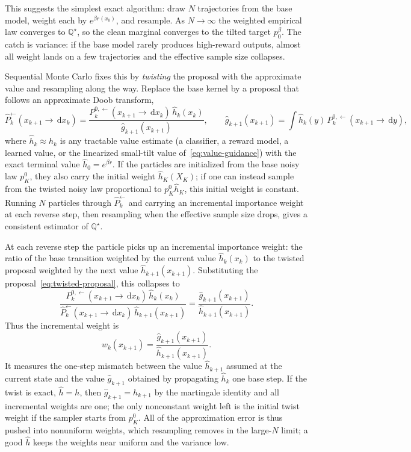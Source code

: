 \documentclass{amsart}
\numberwithin{equation}{section}
\theoremstyle{plain}
\theoremstyle{definition}
\theoremstyle{remark}
\newcommand{\dd}{\,\mathrm{d}}
\newcommand{\wh}[1]{\widehat{#1}}
\begin{document}
This suggests the simplest exact algorithm: draw $N$ trajectories from the base
model, weight each by $e^{\beta r(x_0)}$, and resample.  As $N\to\infty$ the
weighted empirical law converges to $\mathbb Q^\star$, so the clean marginal
converges to the tilted target $p_0^\beta$.  The catch is variance: if the base
model rarely produces high-reward outputs, almost all weight lands on a few
trajectories and the effective sample size collapses.

Sequential Monte Carlo fixes this by \emph{twisting} the proposal with the
approximate value and resampling along the way.  Replace the base kernel by a
proposal that follows an approximate Doob transform,
\begin{equation}\label{eq:twisted-proposal}
    \wh P_k^{\leftarrow}(x_{k+1}\to \dd x_k)
    =
    \frac{P_k^{0,\leftarrow}(x_{k+1}\to \dd x_k)\,\wh h_k(x_k)}
    {\wh g_{k+1}(x_{k+1})},
    \qquad
    \wh g_{k+1}(x_{k+1})=\int \wh h_k(y)\,
    P_k^{0,\leftarrow}(x_{k+1}\to \dd y),
\end{equation}
where $\wh h_k\approx h_k$ is any tractable value estimate (a classifier, a
reward model, a learned value, or the linearized small-tilt value
of~\eqref{eq:value-guidance}) with the exact terminal value
$\wh h_0=e^{\beta r}$.  If the particles are initialized from the base noisy
law $p_K^0$, they also carry the initial weight $\wh h_K(X_K)$; if one can
instead sample from the twisted noisy law proportional to $p_K^0\wh h_K$, this
initial weight is constant.  Running $N$ particles through $\wh P_k^{\leftarrow}$ and
carrying an incremental importance weight at each reverse step, then resampling
when the effective sample size drops, gives a consistent estimator of
$\mathbb Q^\star$.

At each reverse step the particle picks up an incremental importance weight: the
ratio of the base transition weighted by the current value $\wh h_k(x_k)$ to the
twisted proposal weighted by the next value $\wh h_{k+1}(x_{k+1})$.  Substituting
the proposal~\eqref{eq:twisted-proposal}, this collapses to
\[
    \frac{
    P_k^{0,\leftarrow}(x_{k+1}\to \dd x_k)\,\wh h_k(x_k)}
    {
    \wh P_k^{\leftarrow}(x_{k+1}\to \dd x_k)\,\wh h_{k+1}(x_{k+1})}
    =
    \frac{\wh g_{k+1}(x_{k+1})}{\wh h_{k+1}(x_{k+1})}.
\]
Thus the incremental weight is
\begin{equation}\label{eq:smc-incremental-weight}
    w_k(x_{k+1})
    =
    \frac{\wh g_{k+1}(x_{k+1})}{\wh h_{k+1}(x_{k+1})}.
\end{equation}
It measures the one-step mismatch between the value $\wh h_{k+1}$ assumed at the
current state and the value $\wh g_{k+1}$ obtained by propagating $\wh h_k$ one
base step.  If the twist is exact, $\wh h=h$, then $\wh g_{k+1}=h_{k+1}$ by the
martingale identity and all incremental weights are one; the only nonconstant
weight left is the initial twist weight if the sampler starts from $p_K^0$.
All of the approximation error is thus pushed into nonuniform weights, which
resampling removes in the large-$N$ limit; a good $\wh h$ keeps the weights near
uniform and the variance low.
\end{document}
